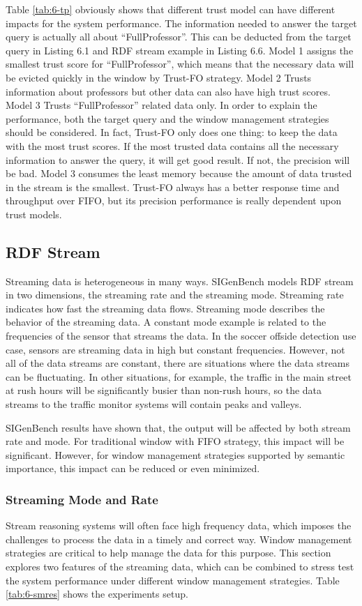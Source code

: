 Table \ref{tab:6-tp} obviously shows that different trust model can have different impacts for the system performance. 
The information needed to answer the target query is actually all about ``FullProfessor''.
This can be deducted from the target query in Listing 6.1 and RDF stream example in Listing 6.6.
Model 1 assigns the smallest trust score for ``FullProfessor'', which means that the necessary data will be evicted quickly in the window by Trust-FO strategy. 
Model 2 Trusts information about professors but other data can also have high trust scores.
Model 3 Trusts ``FullProfessor'' related data only.
In order to explain the performance, both the target query and the window management strategies should be considered. 
In fact, Trust-FO only does one thing: to keep the data with the most trust scores.
If the most trusted data contains all the necessary information to answer the query, it will get good result. 
If not, the precision will be bad. 
Model 3 consumes the least memory because the amount of data trusted in the stream is the smallest. 
Trust-FO always has a better response time and throughput over FIFO, but its precision performance is really dependent upon trust models. 
%
\subsection{RDF Stream}
Streaming data is heterogeneous in many ways. 
SIGenBench models RDF stream in two dimensions, the streaming rate and the streaming mode.
Streaming rate indicates how fast the streaming data flows. 
Streaming mode describes the behavior of the streaming data.
A constant mode example is related to the frequencies of the sensor that streams the data. 
In the soccer offside detection use case, sensors are streaming data in high but constant frequencies. 
However, not all of the data streams are constant, there are situations where the data streams can be fluctuating. 
In other situations, for example, the traffic in the main street at rush hours will be significantly busier than non-rush hours, so the data streams to the traffic monitor systems will contain peaks and valleys.


SIGenBench results have shown that, the output will be affected by both stream rate and mode.
For traditional window with FIFO strategy, this impact will be significant. 
However, for window management strategies supported by semantic importance, this impact can be reduced or even minimized. 
%
\subsubsection{Streaming Mode and Rate}
Stream reasoning systems will often face high frequency data, which imposes the challenges to process the data in a timely and correct way. 
Window management strategies are critical to help manage the data for this purpose. 
This section explores two features of the streaming data, which can be combined to stress test the system performance under different window management strategies. 
Table \ref{tab:6-smres} shows the experiments setup.

